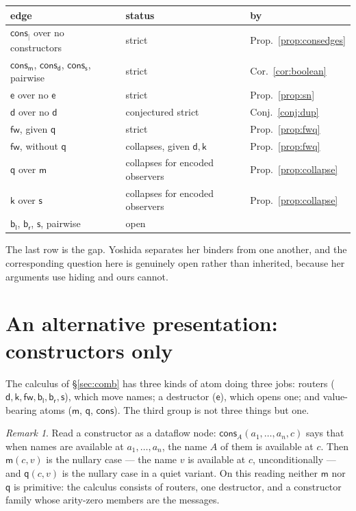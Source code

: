 \documentclass[11pt]{article}
\theoremstyle{plain}
\theoremstyle{definition}
\theoremstyle{remark}
\newtheorem{remark}[theorem]{Remark}
\newcommand{\mm}{\mathsf{m}}
\newcommand{\dd}{\mathsf{d}}
\newcommand{\kk}{\mathsf{k}}
\newcommand{\fw}{\mathsf{fw}}
\newcommand{\bl}{\mathsf{b}_{\mathsf{l}}}
\newcommand{\br}{\mathsf{b}_{\mathsf{r}}}
\newcommand{\sy}{\mathsf{s}}
\newcommand{\ev}{\mathsf{e}}
\newcommand{\qq}{\mathsf{q}}
\newcommand{\cons}{\mathsf{cons}}
\begin{document}
\begin{center}
\begin{tabular}{@{}lll@{}}
\toprule
edge & status & by\\
\midrule
$\cons_{\mid}$ over no constructors & strict & Prop.~\ref{prop:consedges}\\
$\cons_{\mm}$, $\cons_{\dd}$, $\cons_{\sy}$, pairwise & strict &
  Cor.~\ref{cor:boolean}\\
$\ev$ over no $\ev$ & strict & Prop.~\ref{prop:sn}\\
$\dd$ over no $\dd$ & conjectured strict & Conj.~\ref{conj:dup}\\
$\fw$, given $\qq$ & strict & Prop.~\ref{prop:fwq}\\
$\fw$, without $\qq$ & collapses, given $\dd,\kk$ & Prop.~\ref{prop:fwq}\\
$\qq$ over $\mm$ & collapses for encoded observers & Prop.~\ref{prop:collapse}\\
$\kk$ over $\sy$ & collapses for encoded observers & Prop.~\ref{prop:collapse}\\
$\bl$, $\br$, $\sy$, pairwise & open &\\
\bottomrule
\end{tabular}
\end{center}

The last row is the gap. Yoshida separates her binders from one another, and
the corresponding question here is genuinely open rather than inherited,
because her arguments use hiding and ours cannot.

\section{An alternative presentation: constructors only}
\label{sec:altpres}

The calculus of \S\ref{sec:comb} has three kinds of atom doing three jobs:
routers ($\dd,\kk,\fw,\bl,\br,\sy$), which move names; a destructor ($\ev$),
which opens one; and value-bearing atoms ($\mm$, $\qq$, $\cons$). The third
group is not three things but one.

\begin{remark}
Read a constructor as a dataflow node: $\cons_{A}(a_{1},\dots,a_{n},c)$ says
that when names are available at $a_{1},\dots,a_{n}$, the name $A$ of them is
available at $c$. Then $\mm(c,v)$ is the nullary case --- the name $v$ is
available at $c$, unconditionally --- and $\qq(c,v)$ is the nullary case in a
quiet variant. On this reading neither $\mm$ nor $\qq$ is primitive: the
calculus consists of routers, one destructor, and a constructor family whose
arity-zero members are the messages.
\end{remark}
\end{document}
